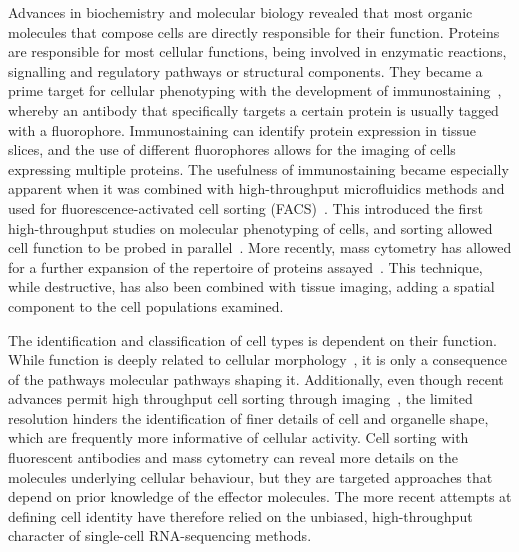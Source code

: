 Advances in biochemistry and molecular biology revealed that most organic molecules that compose cells are directly responsible for their function. Proteins are responsible for most cellular functions, being involved in enzymatic reactions, signalling and regulatory pathways or structural components. They became a prime target for cellular phenotyping with the development of immunostaining~\citep{coons_immunological_1941}, whereby an antibody that specifically targets a certain protein is usually tagged with a fluorophore. Immunostaining can identify protein expression in tissue slices, and the use of different fluorophores allows for the imaging of cells expressing multiple proteins. The usefulness of immunostaining became especially apparent when it was combined with high-throughput microfluidics methods and used for fluorescence-activated cell sorting (FACS)~\citep{bonner_fluorescence_1972}. This introduced the first high-throughput studies on molecular phenotyping of cells, and sorting allowed cell function to be probed in parallel~\citep{julius_demonstration_1972}. More recently, mass cytometry has allowed for a further expansion of the repertoire of proteins assayed~\citep{bandura_mass_2009,di_palma_unraveling_2015}. This technique, while destructive, has also been combined with tissue imaging, adding a spatial component to the cell populations examined.

The identification and classification of cell types is dependent on their function. While function is deeply related to cellular morphology~\citep{prasad_cell_2019}, it is only a consequence of the pathways molecular pathways shaping it. Additionally, even though recent advances permit high throughput cell sorting through imaging~\citep{nitta_intelligent_2018}, the limited resolution hinders the identification of finer details of cell and organelle shape, which are frequently more informative of cellular activity. Cell sorting with fluorescent antibodies and mass cytometry can reveal more details on the molecules underlying cellular behaviour, but they are targeted approaches that depend on prior knowledge of the effector molecules. The more recent attempts at defining cell identity have therefore relied on the unbiased, high-throughput character of single-cell RNA-sequencing methods.



